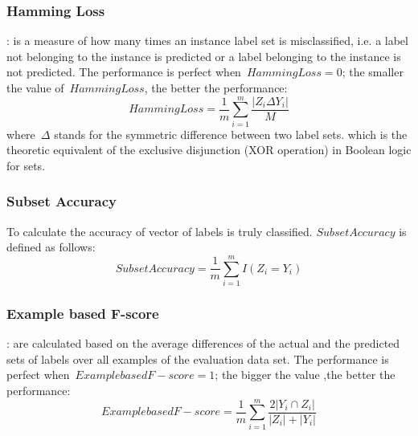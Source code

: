 \documentclass[runningheads,a4paper]{llncs}
\begin{document}

\subsubsection{Hamming Loss}: is a measure of how many times an instance label set is misclassified, i.e. a label not belonging to the instance is predicted or a label belonging to the instance is not predicted. The performance is perfect when~$Hamming Loss=0$; the smaller the value of~$Hamming Loss$, the better the performance:
\begin{equation} 
 Hamming Loss= \frac{1}{m}\sum_{i=1}^{m}  \frac{|Z_i\Delta Y_i|}{M}
\end{equation}
where~$\Delta$ stands for the symmetric difference between two label sets. which is the theoretic equivalent of the exclusive disjunction (XOR operation) in Boolean logic for sets.
\subsubsection{Subset Accuracy}
To calculate the accuracy of vector of labels is truly classified. $Subset Accuracy$ is defined as follows:
\begin{equation} 
 Subset Accuracy= \frac{1}{m}\sum_{i=1}^{m}  I(Z_i = Y_i)
\end{equation}
\subsubsection{Example based F-score}: are calculated based on the average differences of the actual and the predicted sets of labels over all examples of the evaluation data set. The performance is perfect when~$Example based F-score = 1$; the bigger the value ,the better the performance:
\begin{equation} 
 Example based F-score= \frac{1}{m}\sum_{i=1}^{m} \frac{2|Y_i \cap Z_i|}{|Z_i|+|Y_i|}
\end{equation}


 
\end{document}
